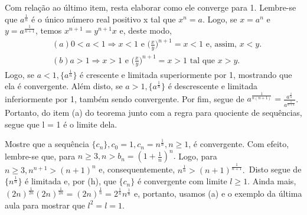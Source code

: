\documentclass[Analysis/analysis_notes.tex]{subfiles}
\begin{document}
\begin{example}
	Com rela\c c\~ao ao \'ultimo item, resta elaborar como ele converge para 1. Lembre-se que $a^{\frac{1}{n}}$ \'e o \'unico n\'umero real positivo
	x tal que $x^{n} = a.$ Logo, se $x = a^{n} $ e $y = a^{\frac{1}{n+1}}$, temos $x^{n+1} = y^{n+1}x$ e, deste modo,
	\begin{align*}
		 & (a) 0 < a < 1 \Rightarrow x < 1 \text{ e } \biggl(\frac{x}{y}\biggr)^{n+1} = x < 1\text{ e, assim, } x < y. \\
		 & (b) a > 1 \Rightarrow x > 1\text{ e }\biggl(\frac{x}{y}\biggr)^{n+1} = x > 1\text{ tal que } x > y.
	\end{align*}
	Logo, se $a < 1,\{a^{\frac{1}{n}}\} $ \'e crescente e limitada superiormente por 1, mostrando que ela \'e convergente. Al\'em disto,
	se $a > 1,\{a^{\frac{1}{n}}\} $ \'e descrescente e limitada inferiormente por 1, tamb\'em sendo convergente. Por fim, segue de
	$a^{\frac{1}{n(n+1)}} = \frac{a^{\frac{1}{n}}}{a^{\frac{1}{n+1}}}$. Portanto, do item (a) do teorema junto com a regra para quociente de
	sequ\^encias, segue que l = 1 \'e o limite dela.
\end{example}\begin{example}
	Mostre que a sequ\^encia $\{c_{n}\}, c_{0} = 1, c_{n} = n^{\frac{1}{n}}, n\geq{1}$, \'e convergente. Com efeito, lembre-se que,
	para $n\geq{3}, n > b_{n} = (1+\frac{1}{n})^{n}.$ Logo, para $n\geq{3}, n^{n+1}>(n+1)^{n}$ e, consequentemente, $n^{\frac{1}{n}} > (n+1)^{\frac{1}{n+1}}.$\
	Disto segue de $\{n^{\frac{1}{n}}\} $ \'e limitada e, por (h), que $\{c_{n}\} $ \'e convergente com limite $l\geq{1}.$ Ainda mais,
	$(2n)^{\frac{1}{2n}}(2n)^{\frac{1}{2n}} = (2n)^{\frac{1}{n}} = 2^{\frac{1}{n}}n^{\frac{1}{n}}$ e, portanto, usamos (a) e o exemplo da \'ultima aula para
	mostrar que $l^{2} = l = 1.$\qedsymbol
\end{example}
\end{document}
